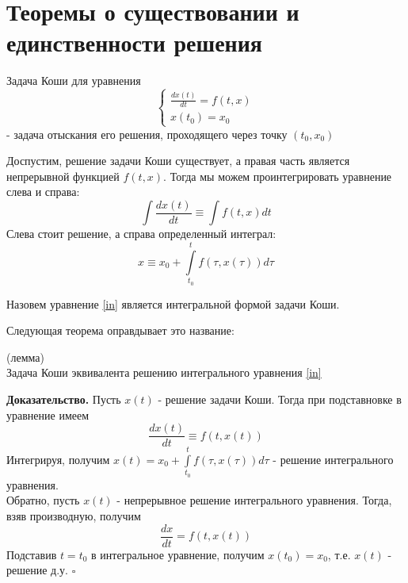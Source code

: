 \section{Теоремы о существовании и единственности решения}
\begin{defin}
Задача Коши для уравнения 
$$\begin{cases}
    \frac{dx(t)}{dt}=f(t,x)\\x(t_0)=x_0
\end{cases}$$
 - задача отыскания его решения, проходящего через точку $(t_0,x_0)$
\end{defin}
Доспустим, решение задачи Коши существует, а правая часть является 
непрерывной функцией $f(t,x)$.
Тогда мы можем проинтегрировать уравнение слева и справа:
 $$\int \frac{dx(t)}{dt} \equiv \int f(t,x)dt$$ 
Слева стоит решение, а справа определенный интеграл:
\begin{equation}\label{in}
 x\equiv x_0+\int\limits_{t_0}^{t}f(\tau,x(\tau))d\tau   
\end{equation}
\begin{defin}
    Назовем уравнение \ref{in} является интегральной формой задачи Коши.
\end{defin}
Следующая теорема оправдывает это название:
\begin{theor} (лемма)\\
    Задача Коши эквивалента решению интегрального уравнения \ref{in}
\end{theor}
\textbf{Доказательство.} Пусть $x(t)$ - решение задачи Коши. Тогда
при подставновке в уравнение имеем 
$$\frac{dx(t)}{dt}\equiv f(t,x(t))$$ 
Интегрируя, получим 
$x(t)=x_0+\int\limits_{t_0}^{t}f(\tau,x(\tau))d\tau$ - решение интегрального
уравнения.\\
Обратно, пусть $x(t)$ - непрерывное решение интегрального уравнения.
Тогда, взяв производную, получим
$$\frac{dx}{dt}=f(t,x(t))$$ 
Подставив $t=t_0$ в интегральное уравнение, получим  $x(t_0)=x_0$, т.е.
$x(t)$ - решение д.у. $\square$ 

